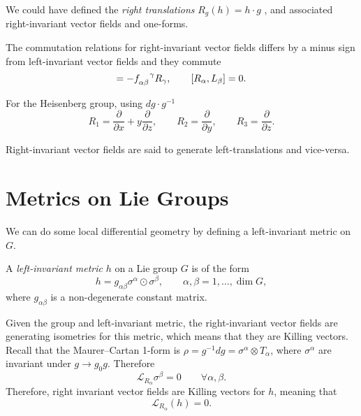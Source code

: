 We could have defined the \emph{right translations} $R_g(h) = h \cdot g$ , and associated right-invariant vector fields and one-forms.
\begin{claim}
  The commutation relations for right-invariant vector fields differs by a minus sign from left-invariant vector fields and they commute
  \begin{equation}
    [R_{\alpha}, R_{\beta}] = -f\indices{_{\alpha\beta}^{\gamma}} R_\gamma, \qquad [R_{\alpha}, L_{\beta}] = 0.
  \end{equation}
\end{claim}
\begin{example}[Nil]
  For the Heisenberg group, using $dg \cdot g^{-1}$
  \begin{equation}
    \label{eq:5-r}
    R_1 = \frac{\partial }{\partial x} + y \frac{\partial }{\partial z}, \qquad R_2 = \frac{\partial }{\partial y}, \qquad R_3 = \frac{\partial }{\partial z}.
  \end{equation}
\end{example}
\begin{notation}[\danger]
  Right-invariant vector fields are said to generate left-translations and vice-versa.
\end{notation}

\section{Metrics on Lie Groups}%
\label{sec:metrics_on_lie_groups}

We can do some local differential geometry by defining a left-invariant metric on $G$.
\begin{definition}
  A \emph{left-invariant metric} $h$ on a Lie group $G$ is of the form
  \begin{equation}
    h = g_{\alpha\beta} \sigma^{\alpha} \odot \sigma^{\beta}, \qquad \alpha, \beta = 1, \dots , \dim G,
  \end{equation}
  where $g_{\alpha\beta}$ is a non-degenerate constant matrix.
\end{definition}
Given the group and left-invariant metric, the right-invariant vector fields are generating isometries for this metric, which means that they are Killing vectors.
Recall that the Maurer--Cartan 1-form is $\rho = g^{-1} dg = \sigma^{\alpha} \otimes T_{\alpha}$, where $\sigma^{\alpha}$ are invariant under $g \to g_0  g$.
Therefore 
\begin{equation}
  \mathcal{L}_{R_{\alpha}} \sigma^{\beta} = 0 \qquad \forall \alpha, \beta.
\end{equation}
Therefore, right invariant vector fields are Killing vectors for $h$, meaning that 
\begin{equation}
  \mathcal{L}_{R_{\alpha}} (h) = 0.
\end{equation}

